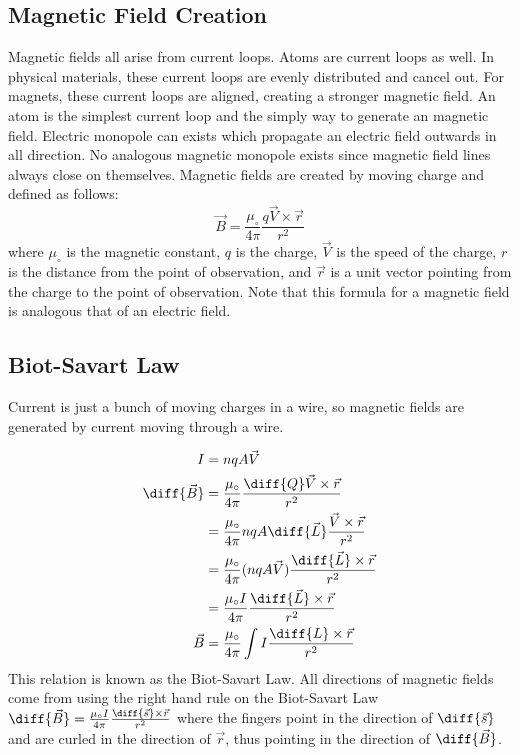 \documentclass{math}
\begin{document}
\subsection*{Magnetic Field Creation}
Magnetic fields all arise from current loops. Atoms are current loops as well.
In physical materials, these current loops are evenly distributed and cancel
out. For magnets, these current loops are aligned, creating a stronger magnetic
field. An atom is the simplest current loop and the simply way to generate an
magnetic field. Electric monopole can exists which propagate an electric field
outwards in all direction. No analogous magnetic monopole exists since magnetic
field lines always close on themselves. Magnetic fields are created by moving
charge and defined as follows:
\[ \vec{B} = \frac{\mu_{\circ}}{4\pi}\frac{q\vec{V}\times\vec{r}}{r^2} \]
where \( \mu_{\circ} \) is the magnetic constant, \( q \) is the charge,
\( \vec{V} \) is the speed of the charge, \( r \) is the distance from the point
of observation, and \( \vec{r} \) is a unit vector pointing from the charge to
the point of observation. Note that this formula for a magnetic field is
analogous that of an electric field.

\subsection*{Biot-Savart Law}
Current is just a bunch of moving charges in a wire, so magnetic fields are
generated by current moving through a wire.
\begin{center}
\end{center}
\begin{align*}
  I &= nqA\vec{V} \\
  \diff{\vec{B}} &=
    \frac{\mu_{\circ}}{4\pi}\frac{\diff{Q}\vec{V}\times\vec{r}}{r^2} \\
  &= \frac{\mu_{\circ}}{4\pi}nqA\diff{\vec{L}}
    \frac{\vec{V}\times\vec{r}}{r^2} \\
  &= \frac{\mu_{\circ}}{4\pi}(nqA\vec{V})
    \frac{\diff{\vec{L}}\times\vec{r}}{r^2} \\
  &= \frac{\mu_{\circ}I}{4\pi}\frac{\diff{\vec{L}}\times\vec{r}}{r^2} \\
  \vec{B} &= \frac{\mu_{\circ}}{4\pi}\int I\frac{\diff{L}\times\vec{r}}{r^2}
\end{align*}
This relation is known as the Biot-Savart Law. All directions of magnetic fields
come from using the right hand rule on the Biot-Savart Law \( \diff{\vec{B}} =
\frac{\mu_{\circ}I}{4\pi}\frac{\diff{\vec{s}}\times\vec{r}}{r^2} \) where the
fingers point in the direction of \( \diff{\vec{s}} \) and are curled in the
direction of \( \vec{r} \), thus pointing in the direction of
\( \diff{\vec{B}} \).
\end{document}
